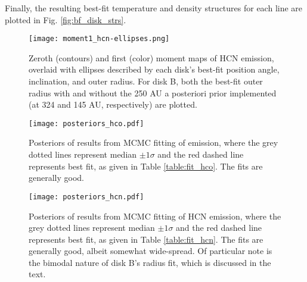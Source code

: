 Finally, the resulting best-fit temperature and density structures for each line are plotted in Fig. \ref{fig:bf_disk_strs}.









\begin{figure}[htp]
  \hspace*{\fill}%
  \texttt{[image: moment1\_hcn-ellipses.png]}\hfill%
  \hspace*{\fill}%
  \caption{Zeroth (contours) and first (color) moment maps of HCN emission, overlaid with ellipses described by each disk's best-fit position angle, inclination, and outer radius. For disk B, both the best-fit outer radius with and without the 250 AU a posteriori prior implemented (at 324 and 145 AU, respectively) are plotted.}
  \label{fig:hcn_m1_ellipses}
\end{figure}




\begin{figure}%
  \hspace*{\fill}%
  \texttt{[image: posteriors\_hco.pdf]}\hfill%
  \hspace*{\fill}%
  \caption{Posteriors of results from MCMC fitting of \hco{} emission, where the grey dotted lines represent median $\pm 1\sigma$ and the red dashed line represents best fit, as given in Table \ref{table:fit_hco}. The fits are generally good.}
  \label{fig:hco_posteriors}
\end{figure}


\begin{figure}%
  \hspace*{\fill}%
  \texttt{[image: posteriors\_hcn.pdf]}\hfill%
  \hspace*{\fill}%
  \caption{Posteriors of results from MCMC fitting of HCN emission, where the grey dotted lines represent median $\pm 1\sigma$ and the red dashed line represents best fit, as given in Table \ref{table:fit_hcn}. The fits are generally good, albeit somewhat wide-spread. Of particular note is the bimodal nature of disk B's radius fit, which is discussed in the text.}
  \label{fig:hcn_posteriors}
\end{figure}


